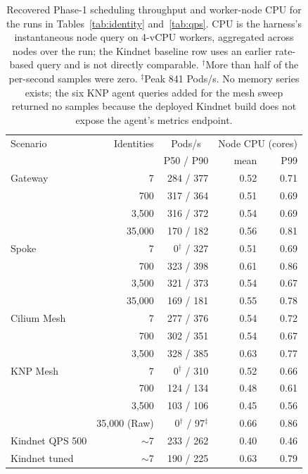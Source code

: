\documentclass[letterpaper,twocolumn,10pt]{article}
\newcommand{\sys}{\textsc{KNP}}
\begin{document}
\begin{table}[t]
\centering
\small
\setlength{\tabcolsep}{3pt}
\begin{tabular}{lrrrr}
\toprule
Scenario & Identities & \multicolumn{1}{c}{Pods/s} & \multicolumn{2}{c}{Node CPU (cores)}\\
 & & P50 / P90 & mean & P99\\
\midrule
Gateway & 7 & 284 / 377 & 0.52 & 0.71\\
 & 700 & 317 / 364 & 0.51 & 0.69\\
 & 3,500 & 316 / 372 & 0.54 & 0.69\\
 & 35,000 & 170 / 182 & 0.56 & 0.81\\
\midrule
Spoke & 7 & 0$^{\dagger}$ / 327 & 0.51 & 0.69\\
 & 700 & 323 / 398 & 0.61 & 0.86\\
 & 3,500 & 321 / 373 & 0.54 & 0.67\\
 & 35,000 & 169 / 181 & 0.55 & 0.78\\
\midrule
Cilium Mesh & 7 & 277 / 376 & 0.54 & 0.72\\
 & 700 & 302 / 351 & 0.54 & 0.67\\
 & 3,500 & 328 / 385 & 0.63 & 0.77\\
\midrule
\sys{} Mesh & 7 & 0$^{\dagger}$ / 310 & 0.52 & 0.66\\
 & 700 & 124 / 134 & 0.48 & 0.61\\
 & 3,500 & 103 / 106 & 0.45 & 0.56\\
 & 35,000 (Raw) & 0$^{\dagger}$ / 97$^{\ddagger}$ & 0.66 & 0.86\\
\midrule
Kindnet QPS 500 & $\sim$7 & 233 / 262 & 0.40 & 0.46\\
Kindnet tuned & $\sim$7 & 190 / 225 & 0.63 & 0.79\\
\bottomrule
\end{tabular}
\caption{Recovered Phase-1 scheduling throughput and worker-node CPU
for the runs in Tables~\ref{tab:identity} and~\ref{tab:qps}. CPU is the
harness's instantaneous node query on 4-vCPU workers, aggregated across
nodes over the run; the Kindnet baseline row uses an earlier
rate-based query and is not directly comparable. $^{\dagger}$More than
half of the per-second samples were zero. $^{\ddagger}$Peak 841 Pods/s.
No memory series exists; the six \sys{} agent queries added for the
mesh sweep returned no samples because the deployed Kindnet build does
not expose the agent's metrics endpoint.}
\label{tab:resources}
\end{table}
\end{document}
